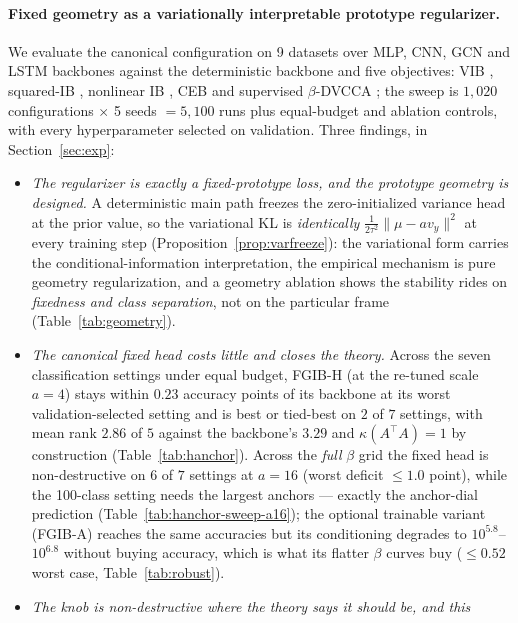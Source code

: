 \documentclass{article} %
\begin{document}
\paragraph{Fixed geometry as a variationally interpretable prototype regularizer.}
We evaluate the canonical configuration on 9 datasets over MLP, CNN, GCN and LSTM
backbones against the deterministic backbone and five objectives: VIB
\citep{alemi2017vib}, squared-IB \citep{kolchinsky2019caveats}, nonlinear IB
\citep{kolchinsky2019nib}, CEB \citep{fischer2020ceb} and supervised $\beta$-DVCCA
\citep{abdelaleem2025dvmib}; the sweep is $1{,}020$ configurations $\times$ 5 seeds
$=5{,}100$ runs plus equal-budget and ablation controls, with every hyperparameter
selected on validation. Three findings, in Section~\ref{sec:exp}:
\begin{itemize}
\item \emph{The regularizer is exactly a fixed-prototype loss, and the prototype
geometry is designed.} A deterministic main path freezes the zero-initialized variance
head at the prior value, so the variational KL is \emph{identically}
$\tfrac{1}{2\tau^2}\|\mu - a v_y\|^2$ at every training step
(Proposition~\ref{prop:varfreeze}): the variational form carries the
conditional-information interpretation, the empirical mechanism is pure geometry
regularization, and a geometry ablation shows the stability rides on
\emph{fixedness and class separation}, not on the particular frame
(Table~\ref{tab:geometry}).
\item \emph{The canonical fixed head costs little and closes the theory.} Across the
seven classification settings under equal budget, FGIB-H (at the re-tuned scale
$a{=}4$) stays within $0.23$ accuracy points of its backbone at its worst
validation-selected setting and is best or tied-best on $2$ of $7$ settings, with mean
rank $2.86$ of $5$ against the backbone's $3.29$ and $\kappa(A^{\top}A)=1$ by
construction (Table~\ref{tab:hanchor}). Across the \emph{full} $\beta$ grid the fixed
head is non-destructive on $6$ of $7$ settings at $a{=}16$ (worst deficit $\le 1.0$
point), while the 100-class setting needs the largest anchors --- exactly the
anchor-dial prediction (Table~\ref{tab:hanchor-sweep-a16}); the optional trainable
variant (FGIB-A) reaches the same accuracies but its conditioning degrades to
$10^{5.8}$--$10^{6.8}$ without buying accuracy, which is what its flatter $\beta$
curves buy ($\le 0.52$ worst case, Table~\ref{tab:robust}).
\item \emph{The knob is non-destructive where the theory says it should be, and this
}
\end{itemize}
\end{document}
